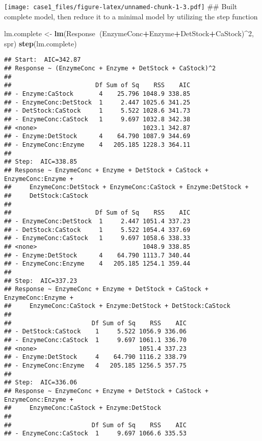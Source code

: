 \documentclass[
]{article}
\newenvironment{Shaded}{\begin{snugshade}}{\end{snugshade}}
\newcommand{\DecValTok}[1]{\textcolor[rgb]{0.00,0.00,0.81}{#1}}
\newcommand{\KeywordTok}[1]{\textcolor[rgb]{0.13,0.29,0.53}{\textbf{#1}}}
\newcommand{\NormalTok}[1]{#1}
\newcommand{\OperatorTok}[1]{\textcolor[rgb]{0.81,0.36,0.00}{\textbf{#1}}}
\newcommand{\StringTok}[1]{\textcolor[rgb]{0.31,0.60,0.02}{#1}}
\begin{document}
\texttt{[image: case1\_files/figure-latex/unnamed-chunk-1-3.pdf]} \#\#
Built complete model, then reduce it to a minimal model by utilizing the
step function

\begin{Shaded}
\begin{Highlighting}[]
\NormalTok{lm.complete <-}\StringTok{ }\KeywordTok{lm}\NormalTok{(Response}\OperatorTok{~}\NormalTok{(EnzymeConc}\OperatorTok{+}\NormalTok{Enzyme}\OperatorTok{+}\NormalTok{DetStock}\OperatorTok{+}\NormalTok{CaStock)}\OperatorTok{^}\DecValTok{2}\NormalTok{, spr)}
\KeywordTok{step}\NormalTok{(lm.complete)}
\end{Highlighting}
\end{Shaded}

\begin{verbatim}
## Start:  AIC=342.87
## Response ~ (EnzymeConc + Enzyme + DetStock + CaStock)^2
## 
##                       Df Sum of Sq    RSS    AIC
## - Enzyme:CaStock       4    25.796 1048.9 338.85
## - EnzymeConc:DetStock  1     2.447 1025.6 341.25
## - DetStock:CaStock     1     5.522 1028.6 341.73
## - EnzymeConc:CaStock   1     9.697 1032.8 342.38
## <none>                             1023.1 342.87
## - Enzyme:DetStock      4    64.790 1087.9 344.69
## - EnzymeConc:Enzyme    4   205.185 1228.3 364.11
## 
## Step:  AIC=338.85
## Response ~ EnzymeConc + Enzyme + DetStock + CaStock + EnzymeConc:Enzyme + 
##     EnzymeConc:DetStock + EnzymeConc:CaStock + Enzyme:DetStock + 
##     DetStock:CaStock
## 
##                       Df Sum of Sq    RSS    AIC
## - EnzymeConc:DetStock  1     2.447 1051.4 337.23
## - DetStock:CaStock     1     5.522 1054.4 337.69
## - EnzymeConc:CaStock   1     9.697 1058.6 338.33
## <none>                             1048.9 338.85
## - Enzyme:DetStock      4    64.790 1113.7 340.44
## - EnzymeConc:Enzyme    4   205.185 1254.1 359.44
## 
## Step:  AIC=337.23
## Response ~ EnzymeConc + Enzyme + DetStock + CaStock + EnzymeConc:Enzyme + 
##     EnzymeConc:CaStock + Enzyme:DetStock + DetStock:CaStock
## 
##                      Df Sum of Sq    RSS    AIC
## - DetStock:CaStock    1     5.522 1056.9 336.06
## - EnzymeConc:CaStock  1     9.697 1061.1 336.70
## <none>                            1051.4 337.23
## - Enzyme:DetStock     4    64.790 1116.2 338.79
## - EnzymeConc:Enzyme   4   205.185 1256.5 357.75
## 
## Step:  AIC=336.06
## Response ~ EnzymeConc + Enzyme + DetStock + CaStock + EnzymeConc:Enzyme + 
##     EnzymeConc:CaStock + Enzyme:DetStock
## 
##                      Df Sum of Sq    RSS    AIC
## - EnzymeConc:CaStock  1     9.697 1066.6 335.53

\end{verbatim}
\end{document}
